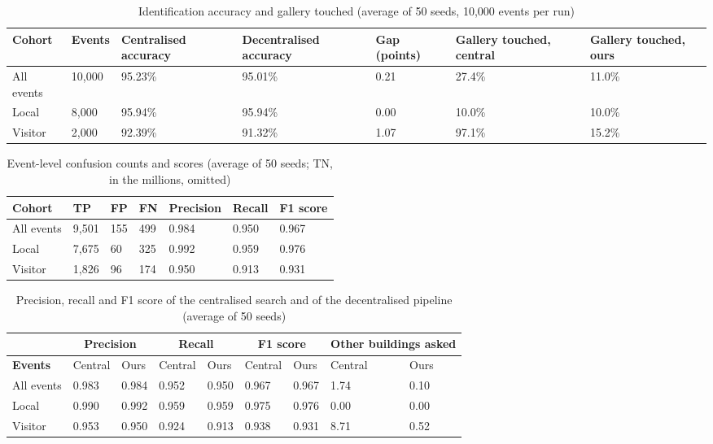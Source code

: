 \documentclass[12pt,a4paper,oneside]{report}
\begin{document}
\begin{table}[htbp]
\centering
\caption{Identification accuracy and gallery touched (average of 50 seeds, 10,000 events per run)}\label{tab:central}
{\small\setlength{\tabcolsep}{4pt}\renewcommand{\arraystretch}{1.2}
\begin{tabular}{|p{2.5cm}|p{1.4cm}|p{2.1cm}|p{2.3cm}|p{1.3cm}|p{1.9cm}|p{1.9cm}|}\hline
\textbf{Cohort} & \textbf{Events} & \textbf{Centralised accuracy} & \textbf{Decentralised accuracy} & \textbf{Gap (points)} & \textbf{Gallery touched, central} & \textbf{Gallery touched, ours}\\\hline
All events & 10,000 & 95.23\% & 95.01\% & 0.21 & 27.4\% & 11.0\%\\\hline
Local & 8,000 & 95.94\% & 95.94\% & 0.00 & 10.0\% & 10.0\%\\\hline
Visitor & 2,000 & 92.39\% & 91.32\% & 1.07 & 97.1\% & 15.2\%\\\hline
\end{tabular}}
\end{table}

\begin{table}[htbp]
\centering
\caption{Event-level confusion counts and scores (average of 50 seeds; TN, in the millions, omitted)}\label{tab:events}
{\small\setlength{\tabcolsep}{4pt}\renewcommand{\arraystretch}{1.2}
\begin{tabular}{|p{2.97cm}|p{1.78cm}|p{1.48cm}|p{1.48cm}|p{1.98cm}|p{1.78cm}|p{1.58cm}|}\hline
\textbf{Cohort} & \textbf{TP} & \textbf{FP} & \textbf{FN} & \textbf{Precision} & \textbf{Recall} & \textbf{F1 score}\\\hline
All events & 9,501 & 155 & 499 & 0.984 & 0.950 & 0.967\\\hline
Local & 7,675 & 60 & 325 & 0.992 & 0.959 & 0.976\\\hline
Visitor & 1,826 & 96 & 174 & 0.950 & 0.913 & 0.931\\\hline
\end{tabular}}
\end{table}

\begin{table}[htbp]
\centering
\caption{Precision, recall and F1 score of the centralised search and of the decentralised pipeline (average of 50 seeds)}\label{tab:censcores}
{\small\setlength{\tabcolsep}{3pt}\renewcommand{\arraystretch}{1.2}
\begin{tabular}{|p{3.0cm}|p{1.2cm}|p{1.2cm}|p{1.2cm}|p{1.2cm}|p{1.2cm}|p{1.2cm}|p{1.2cm}|p{1.2cm}|}\hline
 & \multicolumn{2}{c|}{\textbf{Precision}} & \multicolumn{2}{c|}{\textbf{Recall}} & \multicolumn{2}{c|}{\textbf{F1 score}} & \multicolumn{2}{c|}{\textbf{Other buildings asked}}\\\hline
\textbf{Events} & Central & Ours & Central & Ours & Central & Ours & Central & Ours\\\hline
All events & 0.983 & 0.984 & 0.952 & 0.950 & 0.967 & 0.967 & 1.74 & 0.10\\\hline
Local & 0.990 & 0.992 & 0.959 & 0.959 & 0.975 & 0.976 & 0.00 & 0.00\\\hline
Visitor & 0.953 & 0.950 & 0.924 & 0.913 & 0.938 & 0.931 & 8.71 & 0.52\\\hline
\end{tabular}}
\end{table}
\end{document}
